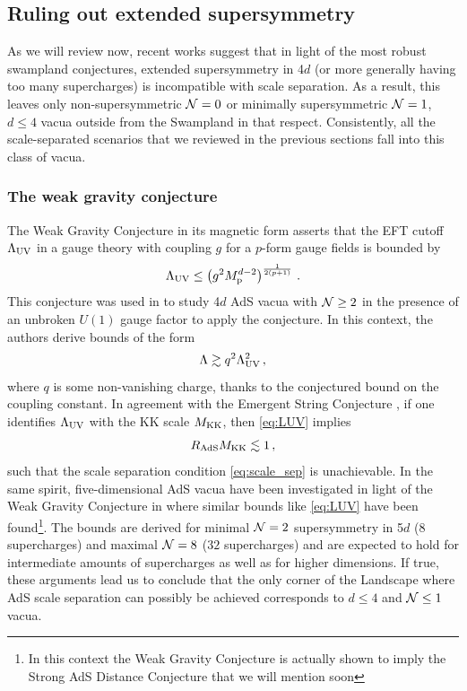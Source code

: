 \documentclass[11pt, a4paper]{article}
\newcommand{\N}{{\cal N}}
\newcommand{\MK}{M_{\rm KK}}
\newcommand{\Mp}{M_{\rm p}}
\newcommand{\Rads}{R_{\rm AdS}}
\newcommand{\LUV}{\Lambda_{\rm UV}}
\begin{document}
\subsection{Ruling out extended supersymmetry}

As we will review now, recent works suggest that in light of the most robust swampland conjectures, extended supersymmetry in 4$d$ (or more generally having too many supercharges) is incompatible with scale separation. As a result, this leaves only non-supersymmetric $\N=0$ or minimally supersymmetric $\N=1$, $d\leq 4$ vacua outside from the Swampland in that respect. Consistently, all the scale-separated scenarios that we reviewed in the previous sections fall into this class of vacua.

\subsubsection{The weak gravity conjecture}

The Weak Gravity Conjecture \cite{ArkaniHamed:2006dz} in its magnetic form asserts that the EFT cutoff $\LUV$ in a gauge theory with coupling $g$ for a $p$-form gauge fields is bounded by
\begin{equation}
\LUV\leq \left(g^2\Mp^{d-2}\right)^{\frac{1}{2(p+1)}}\, .   
\end{equation}
%
This conjecture was used in \cite{Cribiori:2022trc} to study 4$d$ AdS vacua with $\N\geq 2$ in the presence of an unbroken $U(1)$ gauge factor to apply the conjecture. In this context, the authors derive bounds of the form
\begin{equation}
\label{eq:LUV}
\Lambda\gtrsim q^2\LUV^2\, ,
\end{equation}
%
where $q$ is some non-vanishing charge, thanks to the conjectured bound on the coupling constant. In agreement with the Emergent String Conjecture \cite{Lee:2019oct}, if one identifies $\LUV$ with the KK scale $\MK$, then \eqref{eq:LUV} implies
\begin{equation}
\Rads\MK\lesssim 1\, ,
\end{equation}
%
such that the scale separation condition \eqref{eq:scale_sep} is unachievable. In the same spirit, five-dimensional AdS vacua have been investigated in light of the Weak Gravity Conjecture in \cite{Cribiori:2023ihv} where similar bounds like \eqref{eq:LUV} have been found\footnote{In this context the Weak Gravity Conjecture is actually shown to imply the Strong AdS Distance Conjecture that we will mention soon }. The bounds are derived for minimal $\N=2$ supersymmetry in 5$d$ ($8$ supercharges) and maximal $\N=8$ ($32$ supercharges) and are expected to hold for intermediate amounts of supercharges as well as for higher dimensions. If true, these arguments lead us to conclude that the only corner of the Landscape where AdS scale separation can possibly be achieved corresponds to $d\leq 4$ and $\N\leq 1$ vacua.
\end{document}
